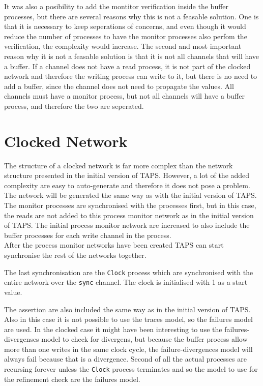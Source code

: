 It was also a posibility to add the montitor verification inside the buffer processes, but there are several reasons why this is not a feasable solution. One is that it is necessary to keep seperations of concerns, and even though it would reduce the number of processes to have the monitor processes also perfom the verification, the complexity would increase. The second and most important reason why it is not a feasable solution is that it is not all channels that will have a buffer. If a channel does not have a read process, it is not part of the clocked network and therefore the writing process can write to it, but there is no need to add a buffer, since the channel does not need to propagate the values. All channels must have a monitor process, but not all channels will have a buffer process, and therefore the two are seperated.

\section{Clocked Network}

The structure of a clocked network is far more complex than the network structure presented in the initial version of TAPS. However, a lot of the added complexity are easy to auto-generate and therefore it does not pose a problem. The network will be generated the same way as with the initial version of TAPS. The monitor processes are synchronised with the processes first, but in this case, the reads are not added to this process monitor network as in the initial version of TAPS. The initial process monitor network are increased to also include the buffer processes for each write channel in the process. \\

After the process monitor networks have been created TAPS can start synchronise the rest of the networks together.

The last synchronisation are the \texttt{Clock} process which are synchronised with the entire network over the \texttt{sync} channel. The clock is initialised with 1 as a start value.

The assertion are also included the same way as in the initial version of TAPS. Also in this case it is not possible to use the traces model, so the failures model are used. In the clocked case it might have been interesting to use the failures-divergenses model to check for divergens, but because the buffer process allow more than one writes in the same clock cycle, the failure-divergences model will always fail because that is a divergence. Second of all the actual processes are recursing forever unless the \texttt{Clock} process terminates and so the model to use for the refinement check are the failures model.


